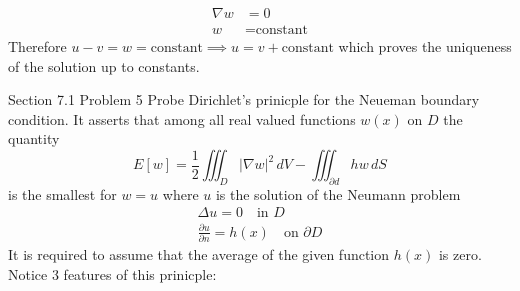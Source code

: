 \documentclass[answers,12pt,addpoints]{exam}
\begin{document}
\begin{questions}
\begin{solution}
\begin{align*}
            \nabla w &= 0\\
            w &= \text{constant}
        \end{align*}
        Therefore $u - v = w = \text{constant} \implies u = v + \text{constant}$ which proves the uniqueness of the solution up to constants.
    \end{solution}
    \question Section 7.1 Problem 5
    Probe Dirichlet's prinicple for the Neueman boundary condition. It asserts that among all real valued functions $w(x)$ on $D$ the quantity
    $$ E[w] = \frac{1}{2} \iiint_D |\nabla w|^2 \, dV - \iiint_{\partial d} h w \, dS $$
    is the smallest for $w=u$ where $u$ is the solution of the Neumann problem
    \begin{align*}
        \Delta u = 0 \quad \text{in } D\\
        \frac{\partial u}{\partial n} = h(x) \quad \text{on } \partial D
    \end{align*}
    It is required to assume that the average of the given function $h(x)$ is zero.\\
    Notice 3 features of this prinicple:


\end{questions}
\end{document}
